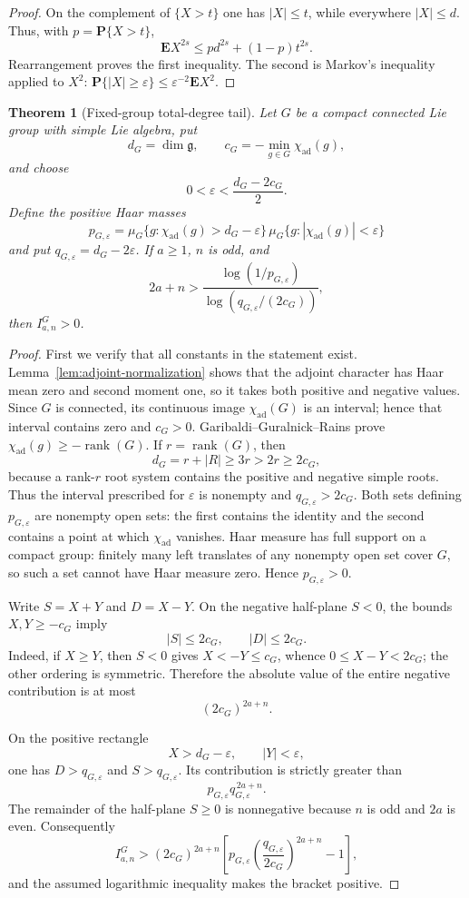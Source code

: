 \documentclass[11pt,reqno]{amsart}
\theoremstyle{plain}
\newtheorem{theorem}{Theorem}[section]
\theoremstyle{definition}
\newcommand{\chiad}{\chi_{\mathrm{ad}}}
\begin{document}
\begin{proof}
On the complement of $\{X>t\}$ one has $|X|\leq t$, while everywhere
$|X|\leq d$.  Thus, with $p=\mathbf P\{X>t\}$,
\[
 \mathbf E X^{2s}\leq p d^{2s}+(1-p)t^{2s}.
\]
Rearrangement proves the first inequality.  The second is Markov's
inequality applied to $X^2$:
$\mathbf P\{|X|\geq\varepsilon\}\leq\varepsilon^{-2}\mathbf E X^2$.
\end{proof}

\begin{theorem}[Fixed-group total-degree tail]
\label{thm:fixed-group-total-degree-tail}
Let $G$ be a compact connected Lie group with simple Lie algebra, put
\[
 d_G=\dim\mathfrak g,
 \qquad
 c_G=-\min_{g\in G}\chiad(g),
\]
and choose
\[
 0<\varepsilon<\frac{d_G-2c_G}{2}.
\]
Define the positive Haar masses
\[
 p_{G,\varepsilon}
 =\mu_G\{g:\chiad(g)>d_G-\varepsilon\}\,
  \mu_G\{g:|\chiad(g)|<\varepsilon\}
\]
and put $q_{G,\varepsilon}=d_G-2\varepsilon$.  If $a\geq1$, $n$ is odd,
and
\[
 2a+n>
 \frac{\log(1/p_{G,\varepsilon})}
      {\log(q_{G,\varepsilon}/(2c_G))},
\]
then $I^G_{a,n}>0$.
\end{theorem}

\begin{proof}
First we verify that all constants in the statement exist.
Lemma~\ref{lem:adjoint-normalization} shows that the adjoint character has
Haar mean zero and second moment one, so it takes both positive and negative
values.  Since $G$ is connected, its continuous image
$\chiad(G)$ is an interval; hence that interval contains zero and $c_G>0$.
Garibaldi--Guralnick--Rains
\cite[Theorem~2.1]{GaribaldiGuralnickRains2025} prove
$\chiad(g)\geq-\operatorname{rank}(G)$.  If $r=\operatorname{rank}(G)$, then
\[
 d_G=r+|R|\geq3r>2r\geq2c_G,
\]
because a rank-$r$ root system contains the positive and negative simple
roots.  Thus the interval prescribed for $\varepsilon$ is nonempty and
$q_{G,\varepsilon}>2c_G$.  Both sets defining $p_{G,\varepsilon}$ are
nonempty open sets: the first contains the identity and the second contains
a point at which $\chiad$ vanishes.  Haar measure has full support on a
compact group: finitely many left translates of any nonempty open set cover
$G$, so such a set cannot have Haar measure zero.  Hence
$p_{G,\varepsilon}>0$.

Write $S=X+Y$ and $D=X-Y$.  On the negative half-plane $S<0$, the bounds
$X,Y\geq-c_G$ imply
\[
 |S|\leq2c_G,\qquad |D|\leq2c_G.
\]
Indeed, if $X\geq Y$, then $S<0$ gives $X<-Y\leq c_G$, whence
$0\leq X-Y<2c_G$; the other ordering is symmetric.  Therefore the absolute
value of the entire negative contribution is at most
\[
 (2c_G)^{2a+n}.
\]

On the positive rectangle
\[
 X>d_G-\varepsilon,\qquad |Y|<\varepsilon,
\]
one has $D>q_{G,\varepsilon}$ and $S>q_{G,\varepsilon}$.  Its contribution is
strictly greater than
\[
 p_{G,\varepsilon}q_{G,\varepsilon}^{\,2a+n}.
\]
The remainder of the half-plane $S\geq0$ is nonnegative because $n$ is odd
and $2a$ is even.  Consequently
\[
 I^G_{a,n}>
 (2c_G)^{2a+n}
 \left[
 p_{G,\varepsilon}
 \left(\frac{q_{G,\varepsilon}}{2c_G}\right)^{2a+n}-1
 \right],
\]
and the assumed logarithmic inequality makes the bracket positive.
\end{proof}
\end{document}
